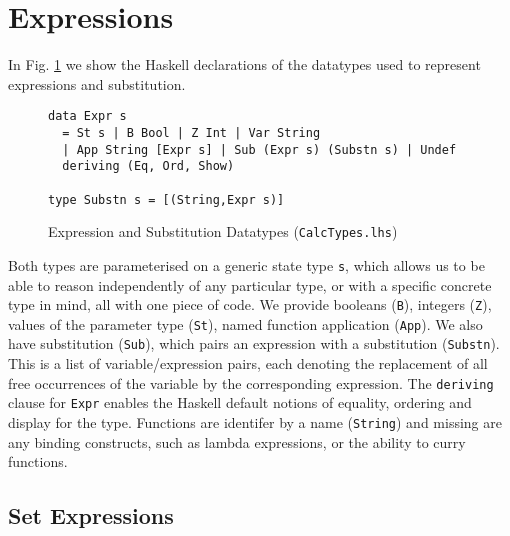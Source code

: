 \section{Expressions}\label{sec:Expressions}

In Fig. \ref{fig:expr-types} we show the Haskell declarations
of the datatypes used to represent expressions and substitution.
\begin{figure}[tb]
\begin{verbatim}
data Expr s
  = St s | B Bool | Z Int | Var String
  | App String [Expr s] | Sub (Expr s) (Substn s) | Undef
  deriving (Eq, Ord, Show)

type Substn s = [(String,Expr s)]
\end{verbatim}
  \caption{Expression and Substitution Datatypes (\texttt{CalcTypes.lhs})}
  \label{fig:expr-types}
\end{figure}
Both types are parameterised on a generic state type \texttt{s},
which allows us to be able to reason independently of any particular type, or with a specific concrete type in mind,
all with one piece of code.
We provide booleans (\texttt{B}),
integers (\texttt{Z}),
values of the parameter type (\texttt{St}),
named function application (\texttt{App}).
We also have substitution (\texttt{Sub}), which pairs an expression
with a substitution (\texttt{Substn}).
This is a list of variable/expression pairs,
each denoting the replacement of all free
occurrences of the variable by the corresponding expression.
The \texttt{deriving} clause for \texttt{Expr} enables the Haskell default notions
of equality, ordering and display for the type.
Functions are identifer by a name (\texttt{String})
and missing are any binding constructs, such as lambda expressions,
or the ability to curry functions.

\subsection{Set Expressions}

